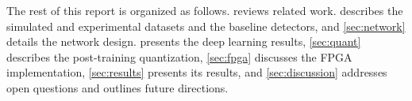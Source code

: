 The rest of this report is organized as follows.  reviews related work.  describes the simulated and experimental datasets and the baseline detectors, and \cref{sec:network} details the network design.  presents the deep learning results, \cref{sec:quant} describes the post-training quantization, \cref{sec:fpga} discusses the FPGA implementation, \cref{sec:results} presents its results, and \cref{sec:discussion} addresses open questions and outlines future directions.
















